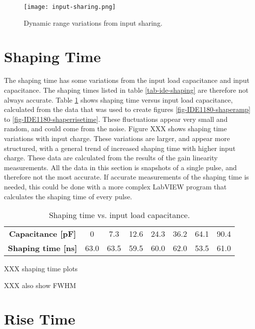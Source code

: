 \documentclass[../main/thesis.tex]{subfiles}
\begin{document}
\begin{figure}[h]
	\centering
	\texttt{[image: input-sharing.png]}
	\caption{Dynamic range variations from input sharing.}
	\label{fig-input-sharing}
\end{figure} 


\section{Shaping Time}
\label{ide-shapingtime}

The shaping time has some variations from the input load capacitance and input capacitance. The shaping times listed in table \ref{tab-ide-shaping} are therefore not always accurate. Table \ref{tab-ide-shaping-c} shows shaping time versus input load capacitance, calculated from the data that was used to create figures \ref{fig-IDE1180-shaperamp} to \ref{fig-IDE1180-shaperrisetime}. These fluctuations appear very small and random, and could come from the noise. Figure XXX shows shaping time variations with input charge. These variations are larger, and appear more structured, with a general trend of increased shaping time with higher input charge. These data are calculated from the results of the gain linearity measurements. All the data in this section is snapshots of a single pulse, and therefore not the most accurate. If accurate measurements of the shaping time is needed, this could be done with a more complex LabVIEW program that calculates the shaping time of every pulse. 

\begin{table}[h!]
	\begin{center}
		\caption{Shaping time vs. input load capacitance.}
		\label{tab-ide-shaping-c}
		\begin{tabular}{cccccccc}\toprule
			\textbf{Capacitance [pF]}      & 0    & 7.3    & 12.6    & 24.3    & 36.2    & 64.1 & 90.4   \\ 
			\textbf{Shaping time [ns]} & 63.0 & 63.5 & 59.5 & 60.0 & 62.0 & 53.5 & 61.0   \\ \bottomrule
		\end{tabular}
	\end{center}
\end{table}

XXX shaping time plots

XXX also show FWHM

\section{Rise Time}
\label{ide-risetime}
\end{document}
